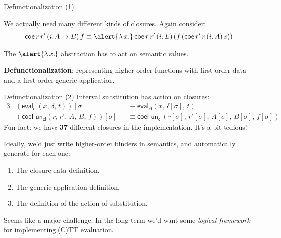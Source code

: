 \documentclass[dvipsnames]{beamer}
\newcommand{\ms}[1]{\mathsf{#1}}
\newcommand{\coe}{\mathsf{coe}}
\newcommand{\eval}{\ms{eval}}
\begin{document}
\begin{frame}{Defunctionalization (1)}

We actually need many different kinds of closures. Again consider:
\[ \coe\,r\,r'\,(i.\,A \to B)\,f \equiv \alert{\lambda\,x.}\,\coe\,r\,r'\,(i.\,B)\,(f\,(\coe\,r'\,r\,(i.\,A)\,x)) \]

The $\alert{\lambda\,x.}$ abstraction has to act on semantic values.
\vspace{0.8em}
\pause




\begin{block}{}\textbf{Defunctionalization}: representing higher-order functions
with first-order data and a first-order generic application.
\end{block}
\end{frame}

\begin{frame}{Defunctionalization (2)}
Interval substitution has action on closures:
\begin{alignat*}{3}
  & (\eval_{\ms{cl}}(x,\,\delta,\,t))[\sigma] && \equiv \eval_{\ms{cl}}(x,\,\delta[\sigma],\,t) \\
  & (\ms{coeFun}_{\ms{cl}}(r,\,r',\,A,\,B,\,f))[\sigma] && \equiv \ms{coeFun}_{\ms{cl}}(r[\sigma],\,r'[\sigma],\,A[\sigma],\,B[\sigma],\,f[\sigma])
\end{alignat*}
\pause
Fun fact: we have \textbf{37} different closures in the implementation. It's a bit tedious!
\vspace{1em}
\pause

Ideally, we'd just write higher-order binders in semantics, and automatically
generate for each one:
\begin{enumerate}
  \item The closure data definition.
  \item The generic application definition.
  \item The definition of the action of substitution.
\end{enumerate}
\vspace{0.5em}
\pause

Seems like a major challenge. In the long term we'd want some \emph{logical framework}
for implementing (C)TT evaluation.
\end{frame}
\end{document}

